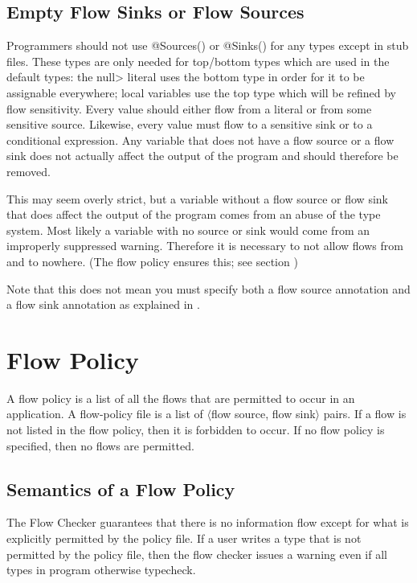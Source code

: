 \subsection{Empty Flow Sinks or Flow Sources\label{sec:emptyflow}}

Programmers should not use @Sources(\ttcbs) or @Sinks(\ttcbs) for
any types except in stub files.
These types are only needed for top/bottom types which are used in the
default types: the \<null> literal uses the bottom type in order for
it to be assignable everywhere; local variables use the top type which
will be refined by flow sensitivity.
Every value should either flow from a literal or from some sensitive
source.  Likewise, every value must flow to a sensitive sink or to a
conditional expression.  Any variable that does not have a flow source
or a flow sink does not actually affect the output of the program and
should therefore be removed.
  
This may seem overly strict, but a variable without a flow source or
flow sink that does affect the output of the program comes from an
abuse of the type system.  Most likely a variable with no source or
sink would come from an improperly suppressed warning. Therefore it is
necessary to not allow flows from and to nowhere.  (The flow policy
ensures this; see section )

Note that this does not mean you must specify both a flow source
annotation and a flow sink annotation as explained in
. 

 


\section{Flow Policy\label{sec:flow-policy}}

A flow policy is a list of all the flows that are permitted to occur in an application.
A flow-policy file is a list 
 of $\langle$flow source, flow sink$\rangle$ pairs.  If a flow is not listed in the flow policy, then 
 it is forbidden to occur.  If no flow policy is specified, then no flows are permitted. 
 
\subsection{Semantics of a Flow Policy}
\label{sec:undsiredflows}
The Flow Checker guarantees that there is no information
flow except for what is explicitly permitted by the policy file. If a user writes a type that is
not permitted by the policy file, then the flow checker issues a warning
even if all types in program otherwise typecheck.

